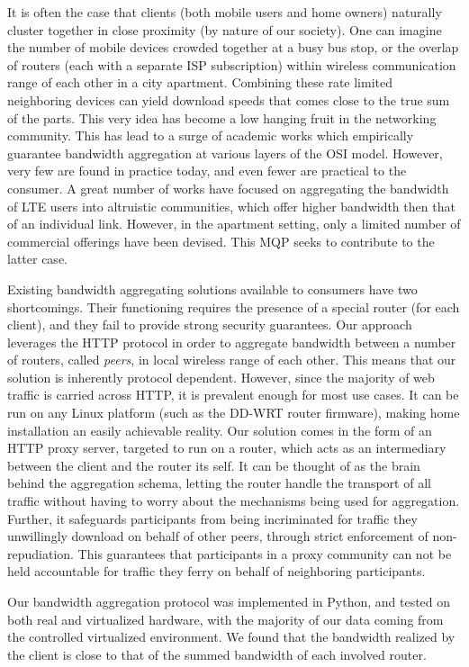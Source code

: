 \documentclass[12pt]{article}
\begin{document}
	It is often the case that clients (both mobile users and home owners) naturally cluster together in close proximity (by nature of our society). One can imagine the number of mobile devices crowded together at a busy bus stop, or the overlap of routers (each with a separate ISP subscription) within wireless communication range of each other in a city apartment. Combining these rate limited neighboring devices can yield download speeds that comes close to the true sum of the parts. This very idea has become a low hanging fruit in the networking community. This has lead to a surge of academic works which empirically guarantee bandwidth aggregation at various layers of the OSI model. However, very few are found in practice today, and even fewer are practical to the consumer. A great number of works have focused on aggregating the bandwidth of LTE users into altruistic communities, which offer higher bandwidth then that of an individual link. However, in the apartment setting, only a limited number of commercial offerings have been devised. This MQP seeks to contribute to the latter case. 

	Existing bandwidth aggregating solutions available to consumers have two shortcomings. Their functioning requires the presence of a special router (for each client), and they fail to provide strong security guarantees. Our approach leverages the HTTP protocol in order to aggregate bandwidth between a number of routers, called {\it peers}, in local wireless range of each other. This means that our solution is inherently protocol dependent. However, since the majority of web traffic is carried across HTTP, it is prevalent enough for most use cases. It can be run on any Linux platform (such as the DD-WRT router firmware), making home installation an easily achievable reality. Our solution comes in the form of an HTTP proxy server, targeted to run on a router, which acts as an intermediary between the client and the router its self. It can be thought of as the brain behind the aggregation schema, letting the router handle the transport of all traffic without having to worry about the mechanisms being used for aggregation. Further, it safeguards participants from being incriminated for traffic they unwillingly download on behalf of other peers, through strict enforcement of non-repudiation. This guarantees that participants in a proxy community can not be held accountable for traffic they ferry on behalf of neighboring participants. 

	Our bandwidth aggregation protocol was implemented in Python, and tested on both real and virtualized hardware, with the majority of our data coming from the controlled virtualized environment. We found that the bandwidth realized by the client is close to that of the summed bandwidth of each involved router. 
\end{document}
